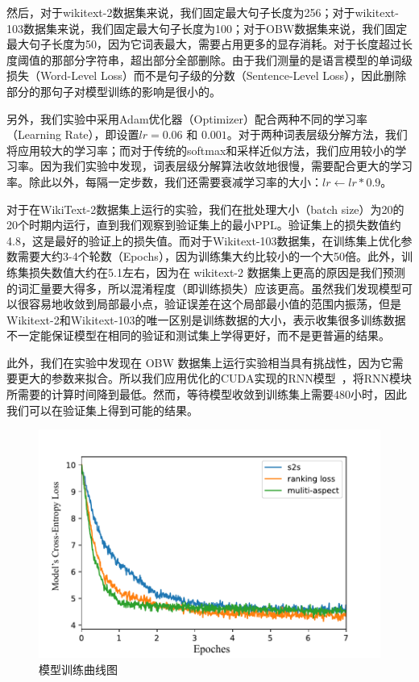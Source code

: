 然后，对于wikitext-2数据集来说，我们固定最大句子长度为256；对于wikitext-103数据集来说，我们固定最大句子长度为100；对于OBW数据集来说，我们固定最大句子长度为50，因为它词表最大，需要占用更多的显存消耗。对于长度超过长度阈值的那部分字符串，超出部分全部删除。由于我们测量的是语言模型的单词级损失（Word-Level Loss）而不是句子级的分数（Sentence-Level Loss），因此删除部分的那句子对模型训练的影响是很小的。

另外，我们实验中采用Adam优化器（Optimizer）配合两种不同的学习率（Learning Rate），即设置$ lr = 0.06$ 和 $0.001 $。对于两种词表层级分解方法，我们将应用较大的学习率；而对于传统的softmax和采样近似方法，我们应用较小的学习率。因为我们实验中发现，词表层级分解算法收敛地很慢，需要配合更大的学习率。除此以外，每隔一定步数，我们还需要衰减学习率的大小：$lr \leftarrow lr *0.9$。

对于在WikiText-2数据集上运行的实验，我们在批处理大小（batch size）为20的20个时期内运行，直到我们观察到验证集上的最小$ \mathrm{PPL} $。验证集上的损失数值约4.8，这是最好的验证上的损失值。而对于Wikitext-103数据集，在训练集上优化参数需要大约3-4个轮数（Epochs），因为训练集大约比较小的一个大50倍。此外，训练集损失数值大约在5.1左右，因为在 wikitext-2 数据集上更高的原因是我们预测的词汇量要大得多，所以混淆程度（即训练损失）应该更高。虽然我们发现模型可以很容易地收敛到局部最小点，验证误差在这个局部最小值的范围内振荡，但是Wikitext-2和Wikitext-103的唯一区别是训练数据的大小，表示收集很多训练数据不一定能保证模型在相同的验证和测试集上学得更好，而不是更普遍的结果。

此外，我们在实验中发现在 OBW 数据集上运行实验相当具有挑战性，因为它需要更大的参数来拟合。所以我们应用优化的CUDA实现的RNN模型~，将RNN模块所需要的计算时间降到最低。然而，等待模型收敛到训练集上需要480小时，因此我们可以在验证集上得到可能的结果。
\begin{figure}[!ht]
  \centering
  \includegraphics[width=0.6\columnwidth]{./figures/learn2.pdf}
  \caption{模型训练曲线图}
\end{figure}

